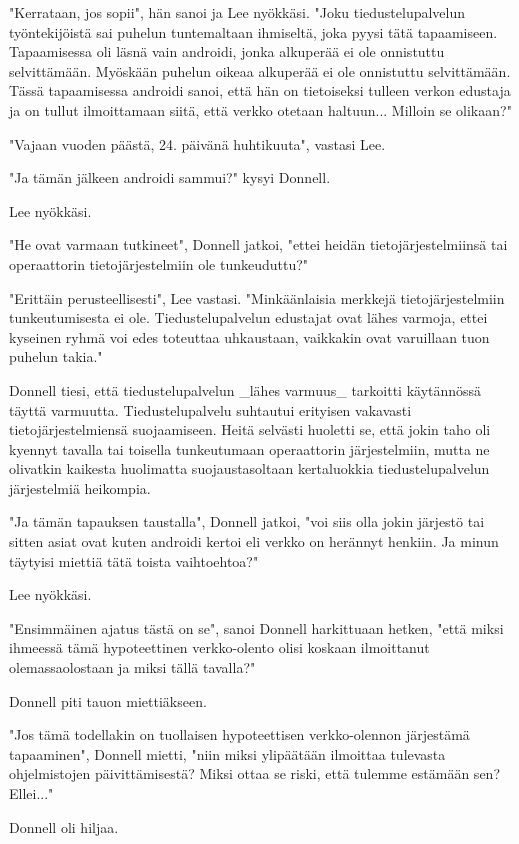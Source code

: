 "Kerrataan, jos sopii", hän sanoi ja Lee nyökkäsi. "Joku tiedustelupalvelun työntekijöistä sai puhelun tuntemaltaan ihmiseltä, joka pyysi tätä tapaamiseen. Tapaamisessa oli läsnä vain androidi, jonka alkuperää ei ole onnistuttu selvittämään. Myöskään puhelun oikeaa alkuperää ei ole onnistuttu selvittämään. Tässä tapaamisessa androidi sanoi, että hän on tietoiseksi tulleen verkon edustaja ja on tullut ilmoittamaan siitä, että verkko otetaan haltuun... Milloin se olikaan?"


"Vajaan vuoden päästä, 24. päivänä huhtikuuta", vastasi Lee.


"Ja tämän jälkeen androidi sammui?" kysyi Donnell.


Lee nyökkäsi.


"He ovat varmaan tutkineet", Donnell jatkoi, "ettei heidän tietojärjestelmiinsä tai operaattorin tietojärjestelmiin ole tunkeuduttu?"


"Erittäin perusteellisesti", Lee vastasi. "Minkäänlaisia merkkejä tietojärjestelmiin tunkeutumisesta ei ole. Tiedustelupalvelun edustajat ovat lähes varmoja, ettei kyseinen ryhmä voi edes toteuttaa uhkaustaan, vaikkakin ovat varuillaan tuon puhelun takia."


Donnell tiesi, että tiedustelupalvelun _lähes varmuus_ tarkoitti käytännössä täyttä varmuutta. Tiedustelupalvelu suhtautui erityisen vakavasti tietojärjestelmiensä suojaamiseen. Heitä selvästi huoletti se, että jokin taho oli kyennyt tavalla tai toisella tunkeutumaan operaattorin järjestelmiin, mutta ne olivatkin kaikesta huolimatta suojaustasoltaan kertaluokkia tiedustelupalvelun järjestelmiä heikompia.


"Ja tämän tapauksen taustalla", Donnell jatkoi, "voi siis olla jokin järjestö tai sitten asiat ovat kuten androidi kertoi eli verkko on herännyt henkiin. Ja minun täytyisi miettiä tätä toista vaihtoehtoa?"


Lee nyökkäsi.


"Ensimmäinen ajatus tästä on se", sanoi Donnell harkittuaan hetken, "että miksi ihmeessä tämä hypoteettinen verkko-olento olisi koskaan ilmoittanut olemassaolostaan ja miksi tällä tavalla?"


Donnell piti tauon miettiäkseen.


"Jos tämä todellakin on tuollaisen hypoteettisen verkko-olennon järjestämä tapaaminen", Donnell mietti, "niin miksi ylipäätään ilmoittaa tulevasta ohjelmistojen päivittämisestä? Miksi ottaa se riski, että tulemme estämään sen? Ellei..."


Donnell oli hiljaa.


